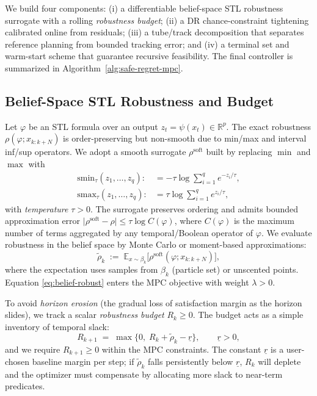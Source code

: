 \documentclass[journal]{IEEEtran}
\theoremstyle{definition}
\begin{document}
We build four components:
(i) a differentiable belief-space STL robustness surrogate with a rolling \emph{robustness budget};
(ii) a DR chance-constraint tightening calibrated online from residuals;
(iii) a tube/track decomposition that separates reference planning from bounded tracking error; and
(iv) a terminal set and warm-start scheme that guarantee recursive feasibility.
The final controller is summarized in Algorithm~\ref{alg:safe-regret-mpc}.

\subsection{Belief-Space STL Robustness and Budget}
\label{subsec:stl}
Let $\varphi$ be an STL formula over an output $z_t=\psi(x_t)\in\mathbb{R}^p$.
The exact robustness $\rho(\varphi; x_{k:k+N})$ is order-preserving but non-smooth due to min/max
and interval inf/sup operators. We adopt a smooth surrogate $\rho^{\text{soft}}$ built by replacing
$\min$ and $\max$ with
\begin{align}
\mathrm{smin}_\tau(z_1,\dots,z_q):&=-\tau\log\!\sum_{i=1}^q e^{-z_i/\tau},\\
\mathrm{smax}_\tau(z_1,\dots,z_q):&=\tau\log\!\sum_{i=1}^q e^{z_i/\tau},
\label{eq:smin-smax}
\end{align}
with \emph{temperature} $\tau>0$. The surrogate preserves ordering and admits bounded approximation
error $\bigl|\rho^{\text{soft}}-\rho\bigr|\le \tau \log C(\varphi)$, where $C(\varphi)$ is the maximum
number of terms aggregated by any temporal/Boolean operator of $\varphi$.
We evaluate robustness in the belief space by Monte Carlo or moment-based approximations:
\begin{equation}
\widetilde{\rho}_k \;:=\; \mathbb{E}_{x\sim\beta_k}\big[\rho^{\text{soft}}(\varphi; x_{k:k+N})\big],
\label{eq:belief-robust}
\end{equation}
where the expectation uses samples from $\beta_k$ (particle set) or unscented points. Equation
\eqref{eq:belief-robust} enters the MPC objective with weight $\lambda>0$.

To avoid \emph{horizon erosion} (the gradual loss of satisfaction margin as the horizon slides),
we track a scalar \emph{robustness budget} $R_k\ge 0$. The budget acts as a simple inventory of
temporal slack:
\begin{equation}
R_{k+1} \;=\; \max\!\Big\{0,\; R_k + \widetilde{\rho}_k - \underline{r}\Big\},
\qquad \underline{r}>0,
\label{eq:budget-update}
\end{equation}
and we require $R_{k+1}\ge 0$ within the MPC constraints. The constant $\underline{r}$ is a
user-chosen baseline margin per step; if $\widetilde{\rho}_k$ falls persistently below $\underline{r}$,
$R_k$ will deplete and the optimizer must compensate by allocating more slack to near-term predicates.
\end{document}
